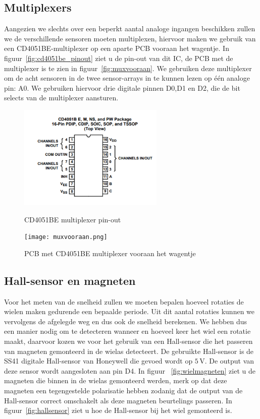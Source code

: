 \subsection{Multiplexers}
Aangezien we slechts over een beperkt aantal analoge ingangen beschikken zullen we de verschillende sensoren moeten multiplexen, hiervoor maken we gebruik van een CD4051BE-multiplexer op een aparte PCB vooraan het wagentje. In figuur~\vref{fig:cd4051be_pinout} ziet u de pin-out van dit IC, de PCB met de multiplexer is te zien in figuur~\vref{fig:muxvooraan}. We gebruiken deze multiplexer om de acht sensoren in de twee sensor-arrays in te kunnen lezen op \'e\'en analoge pin: A0. We gebruiken hiervoor drie digitale pinnen D0,D1 en D2, die de bit selects van de multiplexer aansturen.

\begin{figure}[H]
	\centering
	\begin{minipage}[b]{0.4\textwidth}
		\includegraphics[height=5cm]{cd4051be_pinout.png}
		\caption{CD4051BE multiplexer pin-out}
		\label{fig:cd4051be_pinout}
	\end{minipage}
	\hfill
	\begin{minipage}[b]{0.4\textwidth}
		\texttt{[image: muxvooraan.png]}
		\caption{PCB met CD4051BE multiplexer vooraan het wagentje}
		\label{fig:muxvooraan}
	\end{minipage}
\end{figure}
\subsection{Hall-sensor en magneten}\label{sec:hall-sensor}
Voor het meten van de snelheid zullen we moeten bepalen hoeveel rotaties de wielen maken gedurende een bepaalde periode. Uit dit aantal rotaties kunnen we vervolgens de afgelegde weg en dus ook de snelheid berekenen. We hebben dus een manier nodig om te detecteren wanneer en hoeveel keer het wiel een rotatie maakt, daarvoor kozen we voor het gebruik van een Hall-sensor die het passeren van magneten gemonteerd in de wielas detecteert. De gebruikte Hall-sensor is de SS41 digitale Hall-sensor van Honeywell die gevoed wordt op $5\,\mathrm{V}$. De output van deze sensor wordt aangesloten aan pin D4. In figuur ~\vref{fig:wielmagneten} ziet u de magneten die binnen in de wielas gemonteerd werden, merk op dat deze magneten een tegengestelde polarisatie hebben zodanig dat de output van de Hall-sensor correct omschakelt als deze magneten beurtelings passeren. In figuur~\vref{fig:hallsensor} ziet u hoe de Hall-sensor bij het wiel gemonteerd is.

